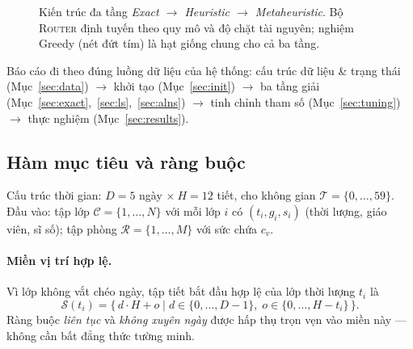 \begin{figure}[H]
\caption{Kiến trúc đa tầng \emph{Exact $\to$ Heuristic $\to$ Metaheuristic}. Bộ
\textsc{Router} định tuyến theo quy mô và độ chặt tài nguyên; nghiệm Greedy (nét
đứt tím) là hạt giống chung cho cả ba tầng.}
\label{fig:pipeline}
\end{figure}

\noindent Báo cáo đi theo đúng luồng dữ liệu của hệ thống: cấu trúc dữ liệu \&
trạng thái (Mục~\ref{sec:data}) $\to$ khởi tạo (Mục~\ref{sec:init}) $\to$ ba tầng
giải (Mục~\ref{sec:exact},~\ref{sec:ls},~\ref{sec:alns}) $\to$ tinh chỉnh tham số
(Mục~\ref{sec:tuning}) $\to$ thực nghiệm (Mục~\ref{sec:results}).

\subsection{Hàm mục tiêu và ràng buộc}
\label{sec:model}
Cấu trúc thời gian: $D=5$ ngày $\times\ H=12$ tiết, cho không gian
$\mathcal{T}=\{0,\dots,59\}$. Đầu vào: tập lớp $\mathcal{C}=\{1,\dots,N\}$ với mỗi
lớp $i$ có $(t_i,g_i,s_i)$ (thời lượng, giáo viên, sĩ số); tập phòng
$\mathcal{R}=\{1,\dots,M\}$ với sức chứa $c_v$.

\paragraph{Miền vị trí hợp lệ.} Vì lớp không vắt chéo ngày, tập tiết bắt đầu hợp lệ
của lớp thời lượng $t_i$ là
\begin{equation}
  \mathcal{S}(t_i) = \big\{\, d\cdot H + o \;\big|\; d\in\{0,\dots,D-1\},\;
  o\in\{0,\dots,H-t_i\} \,\big\}.
  \label{eq:allowed}
\end{equation}
Ràng buộc \emph{liên tục} và \emph{không xuyên ngày} được hấp thụ trọn vẹn vào miền
này --- không cần bất đẳng thức tường minh.

